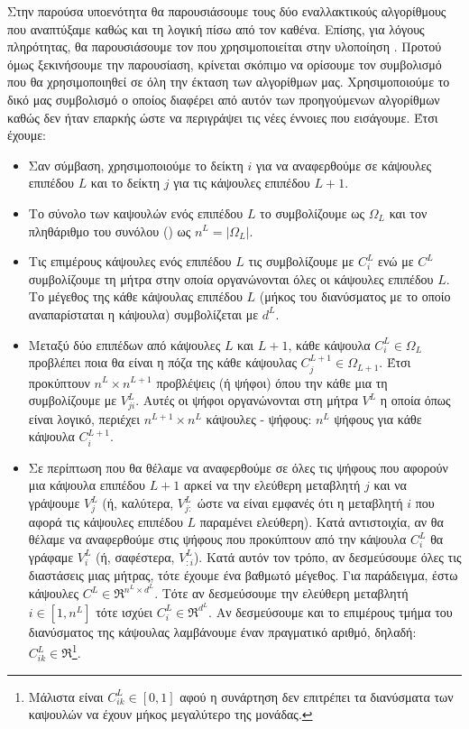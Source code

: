 Στην παρούσα υποενότητα θα παρουσιάσουμε τους δύο εναλλακτικούς αλγορίθμους που αναπτύξαμε καθώς και τη λογική πίσω από τον καθένα. Επίσης, για λόγους πληρότητας, θα παρουσιάσουμε τον  που χρησιμοποιείται στην υλοποίηση \cite{mazzia2021efficient}. Προτού όμως ξεκινήσουμε την παρουσίαση, κρίνεται σκόπιμο να ορίσουμε τον συμβολισμό που θα χρησιμοποιηθεί σε όλη την έκταση των αλγορίθμων μας. Χρησιμοποιούμε το δικό μας συμβολισμό ο οποίος διαφέρει από αυτόν των προηγούμενων αλγορίθμων καθώς δεν ήταν επαρκής ώστε να περιγράψει τις νέες έννοιες που εισάγουμε. Έτσι έχουμε:
\begin{itemize}
  \item Σαν σύμβαση, χρησιμοποιούμε το δείκτη $i$ για να αναφερθούμε σε κάψουλες επιπέδου $L$ και το δείκτη $j$ για τις κάψουλες επιπέδου $L+1$.
  \item Το σύνολο των καψουλών ενός επιπέδου $L$ το συμβολίζουμε ως $\Omega_L$ και τον πληθάριθμο του συνόλου () ως $n^L = \left\lvert \Omega_L \right\rvert$.
  \item Τις επιμέρους κάψουλες ενός επιπέδου $L$ τις συμβολίζουμε με $C^L_i$ ενώ με $C^L$ συμβολίζουμε τη μήτρα στην οποία οργανώνονται όλες οι κάψουλες επιπέδου $L$. Το μέγεθος της κάθε κάψουλας επιπέδου $L$ (μήκος του διανύσματος με το οποίο αναπαρίσταται η κάψουλα) συμβολίζεται με $d^L$.
  \item Μεταξύ δύο επιπέδων από κάψουλες $L$ και $L+1$, κάθε κάψουλα $C^L_i \in \Omega_L$ προβλέπει ποια θα είναι η πόζα της κάθε κάψουλας $C^{L+1}_j \in \Omega_{L+1}$. Έτσι προκύπτουν $n^L \times n^{L+1}$ προβλέψεις (ή ψήφοι) όπου την κάθε μια τη συμβολίζουμε με $V_{ji}^L$. Αυτές οι ψήφοι οργανώνονται στη μήτρα $V^L$ η οποία όπως είναι λογικό, περιέχει $n^{L+1} \times n^L$ κάψουλες - ψήφους: $n^L$ ψήφους για κάθε κάψουλα $C^{L+1}_i$.
  \item Σε περίπτωση που θα θέλαμε να αναφερθούμε σε όλες τις ψήφους που αφορούν μια κάψουλα επιπέδου $L+1$ αρκεί να  την ελεύθερη μεταβλητή $j$ και να γράψουμε $V^L_j$ (ή, καλύτερα, $V^L_{j:}$ ώστε να είναι εμφανές ότι η μεταβλητή $i$ που αφορά τις κάψουλες επιπέδου $L$ παραμένει ελεύθερη). Κατά αντιστοιχία, αν θα θέλαμε να αναφερθούμε στις ψήφους που προκύπτουν από την κάψουλα $C^L_i$ θα γράφαμε $V^L_i$ (ή, σαφέστερα, $V^L_{:i}$). Κατά αυτόν τον τρόπο, αν δεσμεύσουμε όλες τις διαστάσεις μιας μήτρας, τότε έχουμε ένα βαθμωτό μέγεθος. Για παράδειγμα, έστω κάψουλες $C^L \in \Re^{n^L \times d^L}$. Τότε αν δεσμεύσουμε την ελεύθερη μεταβλητή $i \in [1, n^L]$ τότε ισχύει $C_i^L \in \Re^{d^L}$. Αν δεσμεύσουμε και το επιμέρους τμήμα του διανύσματος της κάψουλας λαμβάνουμε έναν πραγματικό αριθμό, δηλαδή: $C_{ik}^L \in \Re$\footnote{Μάλιστα είναι $C_{ik}^L \in [0,1]$ αφού η συνάρτηση  δεν επιτρέπει τα διανύσματα των καψουλών να έχουν μήκος μεγαλύτερο της μονάδας.}.

\end{itemize}
